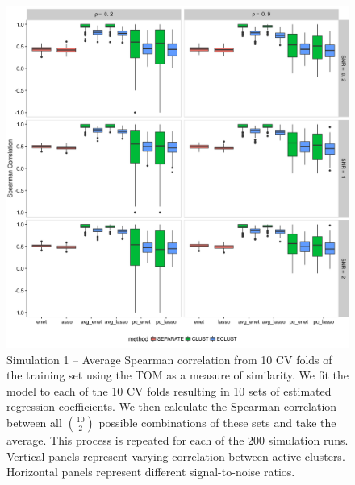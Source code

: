 \begin{appendices}
\begin{figure}[H]
	\centering
	\includegraphics[scale=0.6, keepaspectratio]{./figs/hydra/results/figures/sim1-sept10/spearman_TOM_sim1.png}
	\caption{Simulation 1 -- Average Spearman correlation from 10 CV folds of the training set using the TOM as a measure of similarity. We fit the model to each of the 10 CV folds resulting in 10 sets of estimated regression coefficients. We then calculate the Spearman correlation between all $\binom{10}{2}$ possible combinations of these sets and take the average. This process is repeated for each of the 200 simulation runs. Vertical panels represent varying correlation between active clusters. Horizontal panels represent different signal-to-noise ratios.}
	\label{fig:spearman_TOM_sim1}
\end{figure}



\end{appendices}
